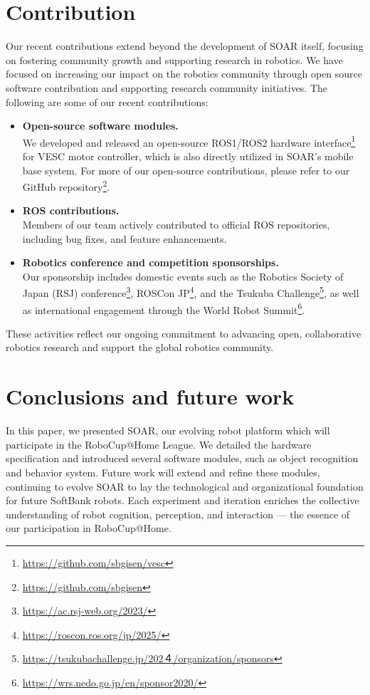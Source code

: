 \documentclass[runningheads,a4paper]{llncs}
\begin{document}
\section{Contribution}
Our recent contributions extend beyond the development of SOAR itself, focusing on fostering community growth and supporting research in robotics.
We have focused on increasing our impact on the robotics community through open source software contribution and supporting research community initiatives.
The following are some of our recent contributions:
\begin{itemize}
	\item \textbf{Open-source software modules.}\\
	We developed and released an open-source ROS1/ROS2 hardware interface\footnote{\url{https://github.com/sbgisen/vesc}} for VESC motor controller, which is also directly utilized in SOAR’s mobile base system.
	For more of our open-source contributions, please refer to our GitHub repository\footnote{\url{https://github.com/sbgisen}}.
	\item \textbf{ROS contributions.}\\
	Members of our team actively contributed to official ROS repositories, including bug fixes, and feature enhancements.
	\item \textbf{Robotics conference and competition sponsorships.}\\
	Our sponsorship includes domestic events such as the Robotics Society of Japan (RSJ) conference\footnote{\url{https://ac.rsj-web.org/2023/}}, ROSCon JP\footnote{\url{https://roscon.ros.org/jp/2025/}}, and the Tsukuba Challenge\footnote{\url{https://tsukubachallenge.jp/202４/organization/sponsors}}, as well as international engagement through the World Robot Summit\footnote{\url{https://wrs.nedo.go.jp/en/sponsor2020/}}.
\end{itemize}
These activities reflect our ongoing commitment to advancing open, collaborative robotics research and support the global robotics community.

\section{Conclusions and future work}
In this paper, we presented SOAR, our evolving robot platform which will participate in the RoboCup@Home League.
We detailed the hardware specification and introduced several software modules, such as object recognition and behavior system.
Future work will extend and refine these modules, continuing to evolve SOAR to lay the technological and organizational foundation for future SoftBank robots.
Each experiment and iteration enriches the collective understanding of robot cognition, perception, and interaction — the essence of our participation in RoboCup@Home.
\end{document}
